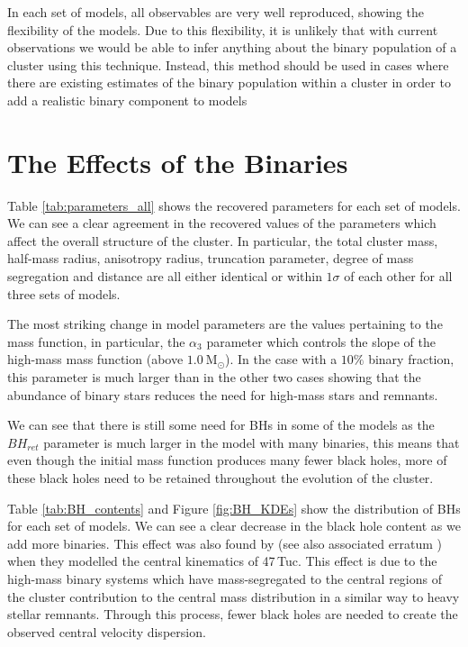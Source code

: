 In each set of models, all observables are very well reproduced, showing the flexibility of the
 models. Due to this flexibility, it is unlikely that with current observations we
would be able to infer anything about the binary population of a cluster using this technique.
Instead, this method should be used in cases where there are existing estimates of the binary
population within a cluster in order to add a realistic binary component to  models



\section{The Effects of the Binaries}


Table \ref{tab:parameters_all} shows the recovered parameters for each set of models. We can see a
clear agreement in the recovered values of the parameters which affect the overall structure of the
cluster. In particular, the total cluster mass, half-mass radius, anisotropy radius, truncation
parameter, degree of mass segregation and distance are all either identical or within $1\sigma$ of
each other for all three sets of models.



The most striking change in model parameters are the values pertaining to the mass function, in
particular, the $\alpha_3$ parameter which controls the slope of the high-mass mass function (above
$1.0 \ \mathrm{M}_\odot$). In the case with a $10\%$ binary fraction, this parameter is much larger
than in the other two cases showing that the abundance of binary stars reduces the need for high-mass
stars and remnants.

We can see that there is still some need for BHs in some of the models as the $BH_{ret}$ parameter
is much larger in the model with many binaries, this means that even though the initial mass
function produces many fewer black holes, more of these black holes need to be retained throughout
the evolution of the cluster.

Table \ref{tab:BH_contents} and Figure \ref{fig:BH_KDEs} show the distribution of BHs for each set
of models. We can see a clear decrease in the black hole content as we add more binaries. This
effect was also found by \citet{Mann2019} (see also associated erratum \citealt{Mann2020}) when they
modelled the central kinematics of 47\,Tuc. This effect is due to the high-mass binary systems which
have mass-segregated to the central regions of the cluster contribution to the central mass
distribution in a similar way to heavy stellar remnants. Through this process, fewer black holes are
needed to create the observed central velocity dispersion.



